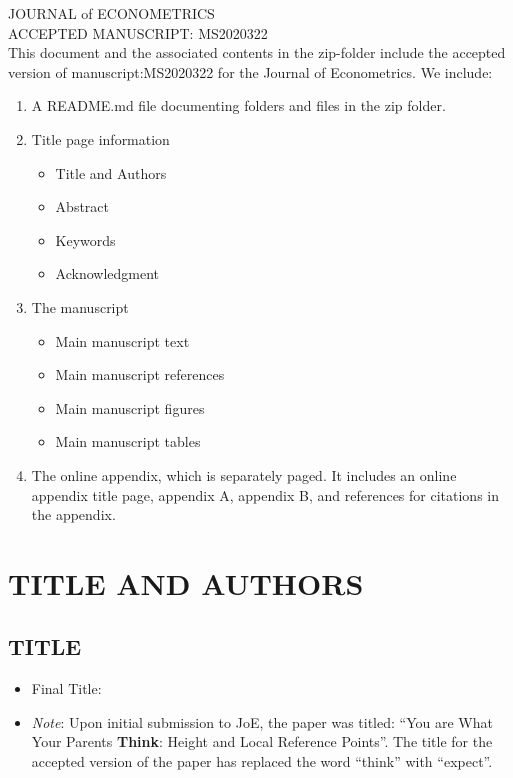 \documentclass[12pt,english]{article}
\begin{document}
\thispagestyle{empty}
\begingroup
  \doublespacing
  \centering
  \LARGE JOURNAL of ECONOMETRICS\\[0.25em]
  \LARGE ACCEPTED MANUSCRIPT: MS2020322 \\[1.0em]
\endgroup
This document and the associated contents in the zip-folder include the accepted version of manuscript:MS2020322 for the Journal of Econometrics. We include:
\begin{enumerate}
    \item A README.md file documenting folders and files in the zip folder.
    \item Title page information
    \begin{itemize}
        \item Title and Authors
        \item Abstract
        \item Keywords
        \item Acknowledgment
    \end{itemize}
    \item The manuscript
    \begin{itemize}
        \item Main manuscript text
        \item Main manuscript references
        \item Main manuscript figures
        \item Main manuscript tables
    \end{itemize}    
    \item The online appendix, which is separately paged. It includes an online appendix title page, appendix A, appendix B, and references for citations in the appendix.
\end{enumerate}
\clearpage


\setcounter{page}{1}

\section*{TITLE AND AUTHORS}
\subsection*{TITLE}
\begin{itemize}[label={}, leftmargin=*]
    \item Final Title: \textbf{\PAPERTITLE}
    \item[] \emph{Note}: Upon initial submission to JoE, the paper was titled: ``You are What Your Parents \textbf{Think}: Height and Local Reference Points''. The title for the accepted version of the paper has replaced the word ``think'' with ``expect''.
\end{itemize}
\end{document}
